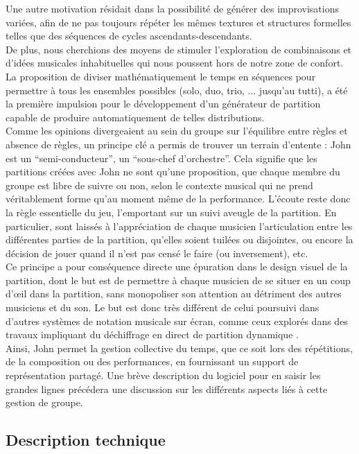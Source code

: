 \noindent Une autre motivation résidait dans la possibilité de générer des improvisations variées, afin de ne pas toujours répéter les mêmes textures et structures formelles telles que des séquences de cycles ascendants-descendants.\\
\indent De plus, nous cherchions des moyens de stimuler l'exploration de combinaisons et d'idées musicales inhabituelles qui nous poussent hors de notre zone de confort. La proposition de diviser mathématiquement le temps en séquences pour permettre à tous les ensembles possibles (solo, duo, trio, ... jusqu'au tutti), a été la première impulsion pour le développement d'un générateur de partition capable de produire automatiquement de telles distributions.\\
\indent Comme les opinions divergeaient au sein du groupe sur l'équilibre entre règles et absence de règles, un principe clé a permis de trouver un terrain d'entente : John est un ``semi-conducteur'', un ``sous-chef d'orchestre''. Cela signifie que les partitions créées avec John ne sont qu'une proposition, que chaque membre du groupe est libre de suivre ou non, selon le contexte musical qui ne prend véritablement forme qu'au moment même de la performance. L'écoute reste donc la règle essentielle du jeu, l'emportant sur un suivi aveugle de la partition. En particulier, sont laissés à l'appréciation de chaque musicien l'articulation entre les différentes parties de la partition, qu'elles soient tuilées ou disjointes, ou encore la décision de jouer quand il n'est pas censé le faire (ou inversement), etc.\\
\indent Ce principe a pour conséquence directe une épuration dans le design visuel de la partition, dont le but est de permettre à chaque musicien de se situer en un coup d'œil dans la partition, sans monopoliser son attention au détriment des autres musiciens et du son. Le but est donc très différent de celui poursuivi dans d'autres systèmes de notation musicale sur écran, comme ceux explorés dans des travaux impliquant du déchiffrage en direct de partition dynamique \cite{freeman_extreme_2008}.\\
\indent Ainsi, John permet la gestion collective du temps, que ce soit lors des répétitions, de la composition ou des performances, en fournissant un support de représentation partagé. Une brève description du logiciel pour en saisir les grandes lignes précédera une discussion sur les différents aspects liés à cette gestion de groupe.

\subsection{Description technique}

